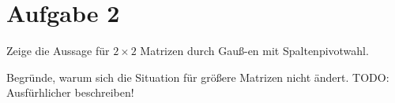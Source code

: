 \section*{Aufgabe 2}
Zeige die Aussage für $2\times2$ Matrizen durch Gauß-en mit
Spaltenpivotwahl.

Begründe, warum sich die Situation für größere Matrizen nicht ändert.
TODO: Ausfürhlicher beschreiben!
